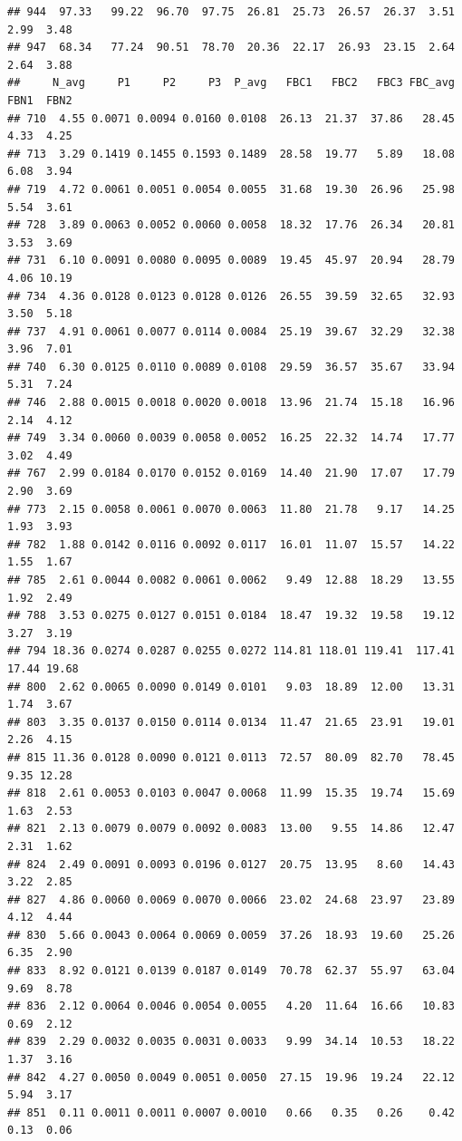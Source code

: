 \documentclass[]{article}
\begin{document}
\begin{verbatim}
## 944  97.33   99.22  96.70  97.75  26.81  25.73  26.57  26.37  3.51  2.99  3.48
## 947  68.34   77.24  90.51  78.70  20.36  22.17  26.93  23.15  2.64  2.64  3.88
##     N_avg     P1     P2     P3  P_avg   FBC1   FBC2   FBC3 FBC_avg  FBN1  FBN2
## 710  4.55 0.0071 0.0094 0.0160 0.0108  26.13  21.37  37.86   28.45  4.33  4.25
## 713  3.29 0.1419 0.1455 0.1593 0.1489  28.58  19.77   5.89   18.08  6.08  3.94
## 719  4.72 0.0061 0.0051 0.0054 0.0055  31.68  19.30  26.96   25.98  5.54  3.61
## 728  3.89 0.0063 0.0052 0.0060 0.0058  18.32  17.76  26.34   20.81  3.53  3.69
## 731  6.10 0.0091 0.0080 0.0095 0.0089  19.45  45.97  20.94   28.79  4.06 10.19
## 734  4.36 0.0128 0.0123 0.0128 0.0126  26.55  39.59  32.65   32.93  3.50  5.18
## 737  4.91 0.0061 0.0077 0.0114 0.0084  25.19  39.67  32.29   32.38  3.96  7.01
## 740  6.30 0.0125 0.0110 0.0089 0.0108  29.59  36.57  35.67   33.94  5.31  7.24
## 746  2.88 0.0015 0.0018 0.0020 0.0018  13.96  21.74  15.18   16.96  2.14  4.12
## 749  3.34 0.0060 0.0039 0.0058 0.0052  16.25  22.32  14.74   17.77  3.02  4.49
## 767  2.99 0.0184 0.0170 0.0152 0.0169  14.40  21.90  17.07   17.79  2.90  3.69
## 773  2.15 0.0058 0.0061 0.0070 0.0063  11.80  21.78   9.17   14.25  1.93  3.93
## 782  1.88 0.0142 0.0116 0.0092 0.0117  16.01  11.07  15.57   14.22  1.55  1.67
## 785  2.61 0.0044 0.0082 0.0061 0.0062   9.49  12.88  18.29   13.55  1.92  2.49
## 788  3.53 0.0275 0.0127 0.0151 0.0184  18.47  19.32  19.58   19.12  3.27  3.19
## 794 18.36 0.0274 0.0287 0.0255 0.0272 114.81 118.01 119.41  117.41 17.44 19.68
## 800  2.62 0.0065 0.0090 0.0149 0.0101   9.03  18.89  12.00   13.31  1.74  3.67
## 803  3.35 0.0137 0.0150 0.0114 0.0134  11.47  21.65  23.91   19.01  2.26  4.15
## 815 11.36 0.0128 0.0090 0.0121 0.0113  72.57  80.09  82.70   78.45  9.35 12.28
## 818  2.61 0.0053 0.0103 0.0047 0.0068  11.99  15.35  19.74   15.69  1.63  2.53
## 821  2.13 0.0079 0.0079 0.0092 0.0083  13.00   9.55  14.86   12.47  2.31  1.62
## 824  2.49 0.0091 0.0093 0.0196 0.0127  20.75  13.95   8.60   14.43  3.22  2.85
## 827  4.86 0.0060 0.0069 0.0070 0.0066  23.02  24.68  23.97   23.89  4.12  4.44
## 830  5.66 0.0043 0.0064 0.0069 0.0059  37.26  18.93  19.60   25.26  6.35  2.90
## 833  8.92 0.0121 0.0139 0.0187 0.0149  70.78  62.37  55.97   63.04  9.69  8.78
## 836  2.12 0.0064 0.0046 0.0054 0.0055   4.20  11.64  16.66   10.83  0.69  2.12
## 839  2.29 0.0032 0.0035 0.0031 0.0033   9.99  34.14  10.53   18.22  1.37  3.16
## 842  4.27 0.0050 0.0049 0.0051 0.0050  27.15  19.96  19.24   22.12  5.94  3.17
## 851  0.11 0.0011 0.0011 0.0007 0.0010   0.66   0.35   0.26    0.42  0.13  0.06

\end{verbatim}
\end{document}
